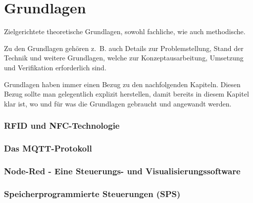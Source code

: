 \chapter{Grundlagen}
\label{cha:Grundlagen}

Zielgerichtete theoretische Grundlagen, sowohl fachliche, wie auch methodische.

Zu den Grundlagen gehören z.~B. auch Details zur Problemstellung, Stand der Technik und weitere Grundlagen, welche zur Konzeptausarbeitung, Umsetzung und Verifikation erforderlich sind.

Grundlagen haben immer einen Bezug zu den nachfolgenden Kapiteln. Diesen Bezug sollte man gelegentlich explizit herstellen, damit bereits in diesem Kapitel klar ist, wo und für was die Grundlagen gebraucht und angewandt werden.

\subsection{RFID und NFC-Technologie}



\subsection{Das MQTT-Protokoll}

\subsection{Node-Red - Eine Steuerungs- und Visualisierungssoftware}

\subsection{Speicherprogrammierte Steuerungen (SPS)}
